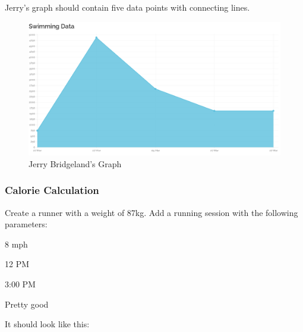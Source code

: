 \documentclass{article}[12pt,a4paper]
\begin{document}
{\clearpage

Jerry's graph should contain five data points with connecting lines.

\begin{figure}[h!]
    \includegraphics[scale=0.33]{images/testing/graphs/jerry}
    \caption{Jerry Bridgeland's Graph}
\end{figure}

\clearpage

\subsubsection{Calorie Calculation}
Create a runner with a weight of 87kg. Add a running session with the following parameters:

\begin{description}[labelindent=1cm]
  \item[Speed:] 8 mph
  \item[Start time:] 12 PM
  \item[Finish time:] 3:00 PM
  \item[Rating:] Pretty good
\end{description}

It should look like this:

}
\end{document}
